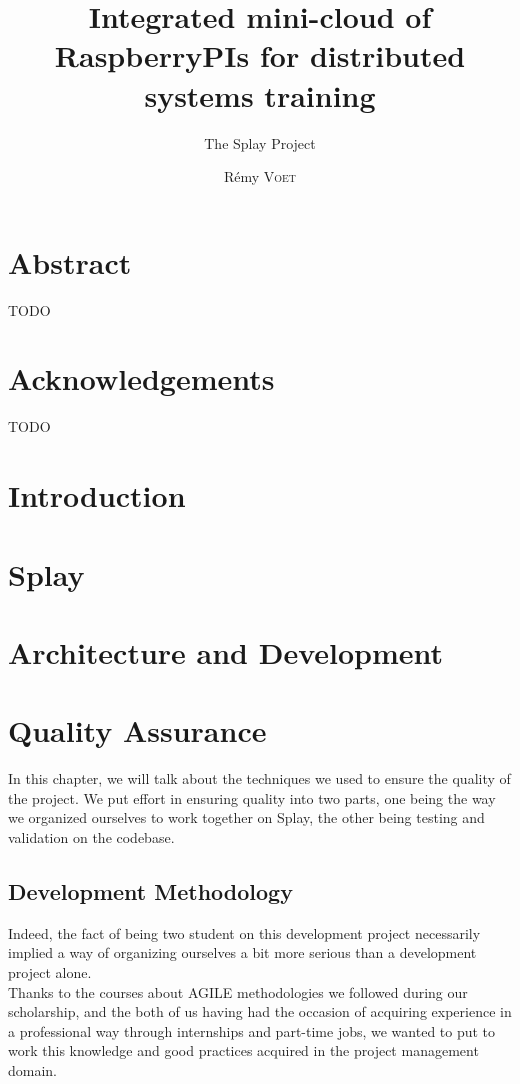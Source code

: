 \documentclass{eplmastersthesis}
\title{Integrated mini-cloud of RaspberryPIs for distributed systems training}
\subtitle{The Splay Project}
\author{Rémy \textsc{Voet}}
\begin{document}
  \maketitle

  \chapter*{Abstract}
  {\color{red} TODO}

  \chapter*{Acknowledgements}
  {\color{red} TODO}

  \tableofcontents

  \chapter{Introduction}

  \chapter{Splay}

  \chapter{Architecture and Development}

  \chapter{Quality Assurance}

    In this chapter, we will talk about the techniques we used to ensure the
    quality of the project. We put effort in ensuring quality into two
    parts, one being the way we organized ourselves to work together on Splay,
    the other being testing and validation on the codebase.

    \section{Development Methodology}

      Indeed, the fact of being two student on this development project necessarily
      implied a way of organizing ourselves a bit more serious than a
      development project alone.\\

      Thanks to the courses about AGILE methodologies we followed during our
      scholarship, and the both of us having had the occasion of acquiring
      experience in a professional way through internships and part-time jobs,
      we wanted to put to work this knowledge and good practices acquired in
      the project management domain.
\end{document}
